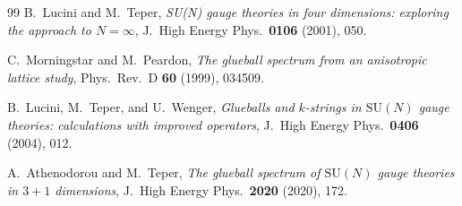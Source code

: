 \documentclass[11pt]{article}
\begin{document}
\begin{thebibliography}{99}
B.~Lucini and M.~Teper,
\textit{SU(N) gauge theories in four dimensions: exploring the
approach to $N = \infty$},
J.\ High Energy Phys.\ \textbf{0106} (2001), 050.

C.~Morningstar and M.~Peardon,
\textit{The glueball spectrum from an anisotropic lattice study},
Phys.\ Rev.\ D \textbf{60} (1999), 034509.

B.~Lucini, M.~Teper, and U.~Wenger,
\textit{Glueballs and $k$-strings in $\mathrm{SU}(N)$ gauge theories:
calculations with improved operators},
J.\ High Energy Phys.\ \textbf{0406} (2004), 012.

A.~Athenodorou and M.~Teper,
\textit{The glueball spectrum of $\mathrm{SU}(N)$ gauge theories in
$3+1$ dimensions},
J.\ High Energy Phys.\ \textbf{2020} (2020), 172.

\end{thebibliography}
\end{document}
